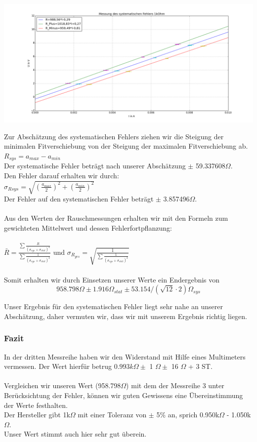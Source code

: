 \documentclass[12pt,a4paper]{article}
\begin{document}
\includegraphics[scale=0.35]{U_gegen_I.png}




Zur Abschätzung des systematischen Fehlers ziehen wir die Steigung der minimalen Fitverschiebung von der Steigung der maximalen Fitverschiebung ab.\\  
$R_{sys} = a_{max} - a_{min}$\\
Der systematische Fehler beträgt nach unserer Abschätzung $\pm$ 59.337608$\Omega$.\\ 
Den Fehler darauf erhalten wir durch:\\
$\sigma_{R sys} = \sqrt{(\frac{a_{max}}{2})^2+(\frac{a_{min}}{2})^2}$\\
Der Fehler auf den systematischen Fehler beträgt $\pm$ 3.857496$\Omega$.\\
\\Aus den Werten der Rauschmessungen erhalten wir mit den Formeln zum gewichteten Mittelwert und dessen Fehlerfortpflanzung:\\
\\$\bar{R} = \frac{\sum{\frac{R}{(\sigma_{sys}+\sigma_{stat})^2}}}{\sum{\frac{1}{(\sigma_{sys}+\sigma_{stat})^2}}}$ und $\sigma_{R_{ges}} = \sqrt{\frac{1}{\sum{\frac{1}{(\sigma_{sys}+\sigma_{stat})^2}}}}$\\
\\Somit erhalten wir durch Einsetzen unserer Werte ein Endergebnis von
\begin{equation}
958.798\Omega \pm 1.916 \Omega_{stat} \pm 53.154 /(\sqrt{12}\cdot2)\Omega_{sys}
\end{equation}
 

Unser Ergebnis für den systematischen Fehler liegt sehr nahe an unserer Abschätzung, daher vermuten wir, dass wir mit unserem Ergebnis richtig liegen.\\ 

\subsubsection{Fazit}
In der dritten Messreihe haben wir den Widerstand mit Hilfe eines Multimeters vermessen. Der Wert hierfür betrug $0.993 k\Omega \pm$ 1 $\Omega \pm$ 16 $\Omega$ + 3 ST. \\ 
\\Vergleichen wir unseren Wert (958.798$\Omega$) mit dem der Messreihe 3 unter Berücksichtung der Fehler, können wir guten Gewissens eine Übereinstimmung der Werte festhalten. 
\\Der Hersteller gibt 1k$\Omega$ mit einer Toleranz von $\pm$ 5\% an, sprich 0.950k$\Omega$ - 1.050k$\Omega$. 
\\Unser Wert stimmt auch hier sehr gut überein.  
\end{document}
